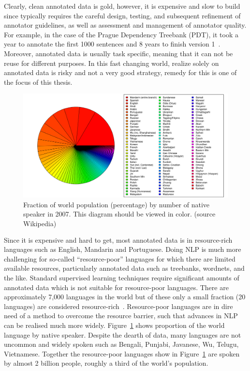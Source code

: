 \documentclass[12pt,twoside,final,hidelinks]{ltthesis}
\theoremstyle{definition}
\begin{document}
Clearly, clean annotated data is gold, however, it is expensive and slow to build since typically requires the careful design, testing, and subsequent refinement of annotator guidelines, as well as assessment and management of annotator quality. For example, in the
case of the Prague Dependency Treebank (PDT), it took a year to annotate the first 1000 sentences and 8 years to finish version 1~\cite{bohmovahhh:2001}. Moreover, annotated data is 
usually task specific, meaning that it can not be reuse for different purposes. In this fast changing world, realize solely on annotated data is risky and not a very good strategy, remedy for this is one of the focus of this thesis. 

\begin{figure}
\centering
\includegraphics[scale=0.4]{Figures/ring_plot_languages}
\caption{Fraction of world population (percentage) by number of native speaker in 2007. This diagram should be viewed in color. (source Wikipedia)}
\label{fig:language_by_speakers}
\end{figure}
Since it is expensive and hard to get, most annotated data is in resource-rich languages such as English, Mandarin and Portuguese. Doing NLP is much more challenging for so-called ``resource-poor'' languages for which there are limited available resources, particularly annotated data such as treebanks, wordnets, and the like. Standard supervised learning techniques require significant amounts of annotated data which is not suitable for resource-poor languages. There are approximately 7,000 languages in the world but of these only a small fraction (20 languages) are considered resource-rich~\cite{BAUMANN14}. 
Resource-poor languages are in dire need of a method to overcome the resource barrier, such that advances in NLP can be realised much more widely. Figure~\ref{fig:language_by_speakers} shows proportion of the world language by native speaker. 
Despite the dearth of data, many languages are not uncommon and widely spoken such as Bengali, Punjabi, Javanese, Wu, Telugu, Vietnamese. Together the resource-poor languages show in Figure~\ref{fig:language_by_speakers} %
are spoken by almost 2 billion people, roughly a third of the world's population. 
\end{document}

